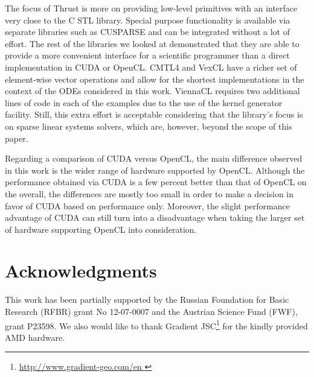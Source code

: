 \documentclass[final]{siamltex}
\newcommand{\addpp}[1]{{#1\nolinebreak[4]\hspace{-.05em}\raisebox{.4ex}{\tiny\bf ++}}\xspace}
\newcommand{\Cpp}{\addpp{C}}
\begin{document}
The focus of Thrust is more on providing low-level primitives with an
interface very close to the \Cpp STL library.  Special purpose
functionality is available via separate libraries such as CUSPARSE and
can be integrated without a lot of effort.  The rest of the libraries
we looked at demonstrated that they are able to provide a more
convenient interface for a scientific programmer than a direct
implementation in CUDA or OpenCL.  CMTL4 and VexCL have a richer set of
element-wise vector operations and allow for the shortest
implementations in the context of the ODEs considered in this work.
ViennaCL requires two additional lines of code in each of the examples due to the use of the kernel generator facility.
Still, this extra effort is acceptable considering that the library's focus is on sparse
linear systems solvers, which are, however, beyond the scope of this
paper.

Regarding a comparison of CUDA versus OpenCL, the main difference observed in
this work is the wider range of hardware supported by OpenCL.  Although the performance
obtained via CUDA is a few percent better than that of OpenCL on the overall,
the differences are mostly too small in order to make a decision in favor of
CUDA based on performance only.  Moreover, the slight performance advantage of
CUDA can still turn into a disadvantage when taking the larger set of hardware
supporting OpenCL into consideration.



\section{Acknowledgments}

This work has been partially supported by the Russian Foundation for Basic
Research (RFBR) grant No 12-07-0007 and the Austrian Science Fund (FWF), grant
P23598.  We also would like to thank Gradient JSC\footnote{ \href{
http://www.gradient-geo.com/en }{ http://www.gradient-geo.com/en } } for the
kindly provided AMD hardware.




\end{document}
